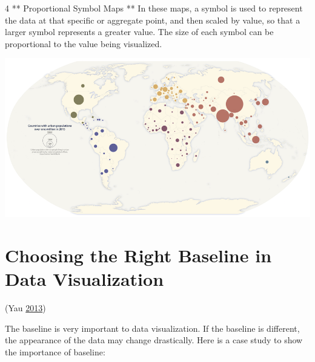 \documentclass[]{book}
\begin{document}
4 ** Proportional Symbol Maps **
In these maps, a symbol is used to represent the data at that specific or aggregate point, and then scaled by value, so that a larger symbol represents a greater value. The size of each symbol can be proportional to the value being visualized.

\includegraphics{images/proportional_symbol_map1.png}

\hypertarget{choosing-the-right-baseline-in-data-visualization}{%
\section{Choosing the Right Baseline in Data Visualization}\label{choosing-the-right-baseline-in-data-visualization}}

(Yau \protect\hyperlink{ref-baseline_2013}{2013})

The baseline is very important to data visualization. If the baseline is different, the appearance of the data may change drastically. Here is a case study to show the importance of baseline:
\end{document}
